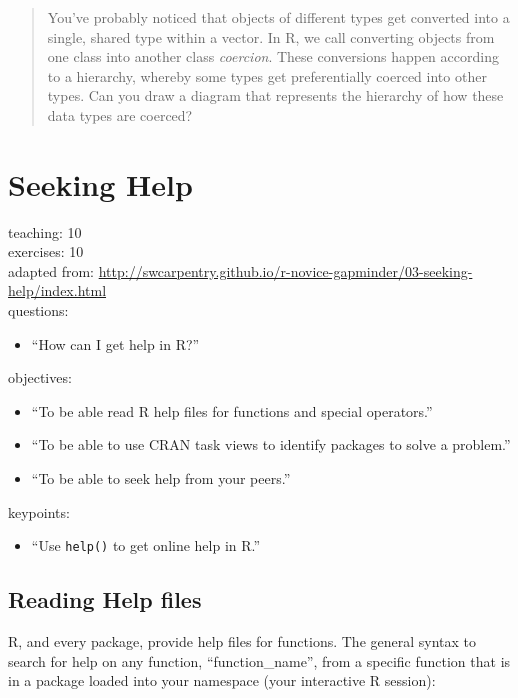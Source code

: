 \documentclass[]{book}
\providecommand{\tightlist}{%
  \setlength{\itemsep}{0pt}\setlength{\parskip}{0pt}}
\begin{document}
\begin{quote}
You've probably noticed that objects of different types get converted
into a single, shared type within a vector. In R, we call converting
objects from one class into another class \emph{coercion}. These
conversions happen according to a hierarchy, whereby some types get
preferentially coerced into other types. Can you draw a diagram that
represents the hierarchy of how these data types are coerced?
\end{quote}

\chapter{Seeking Help}\label{help}

teaching: 10\\
exercises: 10\\
adapted from:
\url{http://swcarpentry.github.io/r-novice-gapminder/03-seeking-help/index.html}\\
questions:

\begin{itemize}
\tightlist
\item
  ``How can I get help in R?''
\end{itemize}

objectives:

\begin{itemize}
\tightlist
\item
  ``To be able read R help files for functions and special
  operators.''\\
\item
  ``To be able to use CRAN task views to identify packages to solve a
  problem.''\\
\item
  ``To be able to seek help from your peers.''
\end{itemize}

keypoints:

\begin{itemize}
\tightlist
\item
  ``Use \texttt{help()} to get online help in R.''
\end{itemize}

\section{Reading Help files}\label{reading-help-files}

R, and every package, provide help files for functions. The general
syntax to search for help on any function, ``function\_name'', from a
specific function that is in a package loaded into your namespace (your
interactive R session):
\end{document}
